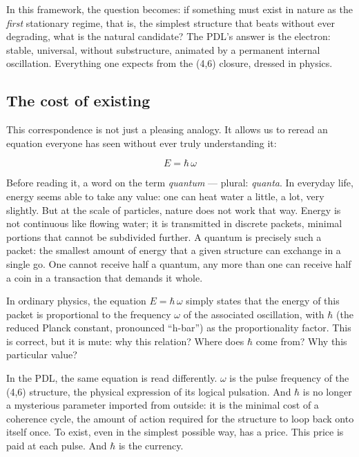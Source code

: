 \documentclass[12pt, a4paper, openright]{book}
\begin{document}
\medskip

In this framework, the question becomes: if something must exist in nature as the \emph{first} stationary regime, that is, the simplest structure that beats without ever degrading, what is the natural candidate? The PDL’s answer is the electron: stable, universal, without substructure, animated by a permanent internal oscillation. Everything one expects from the (4,6) closure, dressed in physics.

\subsection*{The cost of existing}

This correspondence is not just a pleasing analogy. It allows us to reread an equation everyone has seen without ever truly understanding it:

\begin{equation}
E = \hbar\,\omega
\end{equation}

Before reading it, a word on the term \emph{quantum} — plural: \emph{quanta}. In everyday life, energy seems able to take any value: one can heat water a little, a lot, very slightly. But at the scale of particles, nature does not work that way. Energy is not continuous like flowing water; it is transmitted in discrete packets, minimal portions that cannot be subdivided further. A quantum is precisely such a packet: the smallest amount of energy that a given structure can exchange in a single go. One cannot receive half a quantum, any more than one can receive half a coin in a transaction that demands it whole.

\medskip

In ordinary physics, the equation $E = \hbar\,\omega$ simply states that the energy of this packet is proportional to the frequency $\omega$ of the associated oscillation, with $\hbar$ (the reduced Planck constant, pronounced “h-bar”) as the proportionality factor. This is correct, but it is mute: why this relation? Where does $\hbar$ come from? Why this particular value?

\medskip

In the PDL, the same equation is read differently. $\omega$ is the pulse frequency of the (4,6) structure, the physical expression of its logical pulsation. And $\hbar$ is no longer a mysterious parameter imported from outside: it is the minimal cost of a coherence cycle, the amount of action required for the structure to loop back onto itself once. To exist, even in the simplest possible way, has a price. This price is paid at each pulse. And $\hbar$ is the currency.
\end{document}
